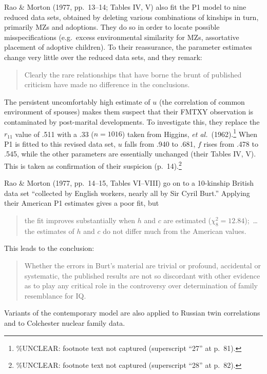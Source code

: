 ﻿\documentclass[12pt]{article}
\begin{document}
Rao \& Morton (1977, pp.\ 13--14; Tables IV, V) also fit the P1 model to nine reduced data sets, obtained by deleting various combinations of kinships in turn, primarily MZs and adoptions. They do so in order to locate possible misspecifications (e.g.\ excess environmental similarity for MZs, assortative placement of adoptive children). To their reassurance, the parameter estimates change very little over the reduced data sets, and they remark:

\begin{quote}
Clearly the rare relationships that have borne the brunt of published criticism have made no difference in the conclusions.
\end{quote}

The persistent uncomfortably high estimate of $u$ (the correlation of common environment of spouses) makes them suspect that their FMTXY observation is contaminated by post-marital developments. To investigate this, they replace the $r_{11}$ value of .511 with a .33 ($n=1016$) taken from Higgins, \emph{et al.}\ (1962).\footnote{\%UNCLEAR: footnote text not captured (superscript ``27'' at p.\ 81).} When P1 is fitted to this revised data set, $u$ falls from .940 to .681, $f$ rises from .478 to .545, while the other parameters are essentially unchanged (their Tables IV, V). This is taken as confirmation of their suspicion (p.\ 14).\footnote{\%UNCLEAR: footnote text not captured (superscript ``28'' at p.\ 82).}

Rao \& Morton (1977, pp.\ 14--15, Tables VI--VIII) go on to a 10-kinship British data set ``collected by English workers, nearly all by Sir Cyril Burt.'' Applying their American P1 estimates gives a poor fit, but

\begin{quote}
the fit improves substantially when $h$ and $c$ are estimated ($\chi_8^2=12.84$);~\ldots the estimates of $h$ and $c$ do not differ much from the American values.
\end{quote}

This leads to the conclusion:

\begin{quote}
Whether the errors in Burt's material are trivial or profound, accidental or systematic, the published results are not so discordant with other evidence as to play any critical role in the controversy over determination of family resemblance for IQ.
\end{quote}

Variants of the contemporary model are also applied to Russian twin correlations and to Colchester nuclear family data.
\end{document}
